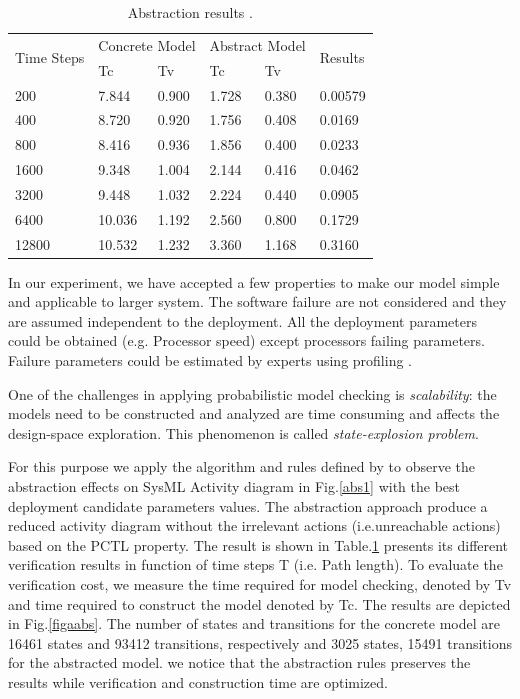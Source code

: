 \documentclass[3p,times,procedia,authoryear,round]{elsarticle}
\begin{document}
\begin{table}[!tp]
    \scriptsize	
    \begin{center}
        \begin{tabular}{  p{1.5cm}p{2cm}p{2cm}p{2cm}p{2cm}m{1.5cm}   }
            \hline
            \multirow{2}{1.5cm}{Time Steps} &\multicolumn{2}{c}{ Concrete Model} & \multicolumn{2}{c}{Abstract Model} &  \multirow{2}{1.5cm}{Results}  \\
            & Tc & Tv & Tc & Tv& \\
            \hline
           200 & 7.844&0.900&1.728&0.380 &0.00579\\
            400  & 8.720&0.920&1.756&0.408&0.0169\\
            800 & 8.416&0.936&1.856&0.400&0.0233\\
            1600&9.348&1.004&2.144&0.416&0.0462\\
            3200&9.448&1.032&2.224&0.440&0.0905\\
            6400&10.036&1.192&2.560&0.800&0.1729\\
            12800&10.532&1.232&3.360&1.168&0.3160\\
            \hline
        \end{tabular}
        \caption{Abstraction results .}
        \label{tabaabs}
    \end{center}
\end{table}



In our experiment, we have accepted a few properties to make our model simple and applicable to larger system. The software failure are not considered and they are assumed independent to the deployment. All the deployment parameters could be obtained (e.g. Processor speed) except processors failing parameters. Failure parameters could be estimated by experts using profiling \citep{Houssin2014107}. 

One of the challenges in applying probabilistic model checking is \emph{scalability}: the models need to be constructed and analyzed are time consuming and affects the design-space exploration.  This phenomenon is called \emph{state-explosion problem}. 

For this purpose we apply the algorithm and rules defined by \citep{Ouchani2014} to observe the abstraction effects on SysML Activity diagram in Fig.\ref{abs1} with the best deployment candidate parameters values. The abstraction approach produce a reduced activity diagram without the irrelevant actions (i.e.unreachable actions) based on the PCTL property. The result is shown in Table.\ref{tabaabs} presents its different verification results in function of time steps T (i.e. Path length). To evaluate the verification cost, we measure the time required for model checking, denoted by Tv and time required to construct the model denoted by Tc.
The results are depicted in Fig.\ref{figaabs}. The number of states and transitions for the concrete model are 16461  states and 93412  transitions, respectively and 3025 states, 15491 transitions for the abstracted model. we notice that the abstraction rules preserves the results while verification and construction time are optimized.
\end{document}
